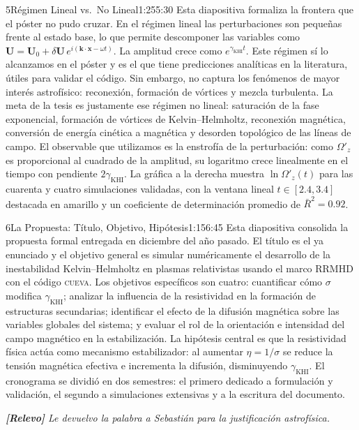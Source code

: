 \documentclass[11pt,a4paper]{article}
\newcommand{\relevo}[1]{%
  \par\medskip
  \noindent\colorbox{tagbg}{\parbox{\dimexpr\linewidth-2\fboxsep\relax}{%
    \small\itshape \textbf{[Relevo]} #1}}\par\medskip}
\begin{document}
\begin{bryorador}{5}{Régimen Lineal vs.\ No Lineal}{1:25}{5:30}
Esta diapositiva formaliza la frontera que el póster no pudo cruzar. En el
régimen lineal las perturbaciones son pequeñas frente al estado base, lo que
permite descomponer las variables como $\mathbf{U}=\mathbf{U}_0+\delta
\mathbf{U}\,e^{i(\mathbf{k}\cdot\mathbf{x}-\omega t)}$. La amplitud crece como
$e^{\gamma_\text{KHI}t}$. Este régimen sí lo alcanzamos en el póster y es el
que tiene predicciones analíticas en la literatura, útiles para validar el
código. Sin embargo, no captura los fenómenos de mayor interés astrofísico:
reconexión, formación de vórtices y mezcla turbulenta. La meta de la tesis es
justamente ese régimen no lineal: saturación de la fase exponencial, formación
de vórtices de Kelvin--Helmholtz, reconexión magnética, conversión de energía
cinética a magnética y desorden topológico de las líneas de campo. El
observable que utilizamos es la enstrofía de la perturbación: como $\Omega'_z$
es proporcional al cuadrado de la amplitud, su logaritmo crece linealmente en
el tiempo con pendiente $2\gamma_\text{KHI}$. La gráfica a la derecha muestra
$\ln\Omega'_z(t)$ para las cuarenta y cuatro simulaciones validadas, con la
ventana lineal $t\in[2.4,3.4]$ destacada en amarillo y un coeficiente de
determinación promedio de $\bar R^2=0.92$.
\end{bryorador}

\begin{bryorador}{6}{La Propuesta: Título, Objetivo, Hipótesis}{1:15}{6:45}
Esta diapositiva consolida la propuesta formal entregada en diciembre del
año pasado. El título es el ya enunciado y el objetivo general es simular
numéricamente el desarrollo de la inestabilidad Kelvin--Helmholtz en plasmas
relativistas usando el marco RRMHD con el código \textsc{cueva}. Los objetivos
específicos son cuatro: cuantificar cómo $\sigma$ modifica
$\gamma_\text{KHI}$; analizar la influencia de la resistividad en la formación
de estructuras secundarias; identificar el efecto de la difusión magnética
sobre las variables globales del sistema; y evaluar el rol de la orientación e
intensidad del campo magnético en la estabilización. La hipótesis central es
que la resistividad física actúa como mecanismo estabilizador: al aumentar
$\eta=1/\sigma$ se reduce la tensión magnética efectiva e incrementa la
difusión, disminuyendo $\gamma_\text{KHI}$. El cronograma se dividió en dos
semestres: el primero dedicado a formulación y validación, el segundo a
simulaciones extensivas y a la escritura del documento.
\relevo{Le devuelvo la palabra a Sebastián para la justificación astrofísica.}
\end{bryorador}
\end{document}
